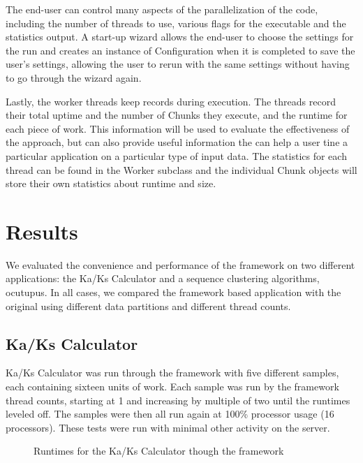 \documentclass[12pt]{article}
\begin{document}
The end-user can control many aspects of the parallelization of the code,
including the number of threads to use, various flags for the executable and the
statistics output.  A start-up wizard allows the end-user to choose the settings
for the run and creates an instance of Configuration when it is completed to
save the user's settings, allowing the user to rerun with the same settings
without having to go through the wizard again.

Lastly, the worker threads keep records during execution. The threads record
their total uptime and the number of Chunks they execute, and the runtime for
each piece of work. This information will be used to evaluate the effectiveness
of the approach, but can also provide useful information the can help a user
tine a particular application on a particular type of input data. The statistics
for each thread can be found in the Worker subclass and the individual Chunk
objects will store their own statistics about runtime and size.

\section{Results}

We evaluated the convenience and performance of the framework on two different
applications: the Ka/Ks Calculator and a sequence clustering algorithms,
ocutupus. In all cases, we compared the framework based application with the
original using different data partitions and different thread counts.

\subsection{Ka/Ks Calculator}
Ka/Ks Calculator was run through the framework with five different samples, each
containing sixteen units of work. Each sample was run by the framework thread
counts, starting at 1 and increasing by multiple of two until the runtimes
leveled off. The samples were then all run again at 100\% processor usage (16
processors). These tests were run with minimal other activity on the server.

\begin{figure}
    \begin{center}
    \end{center}
    \caption{Runtimes for the Ka/Ks Calculator though the framework}
    \label{fig:kaksgraph}
\end{figure}
\end{document}

